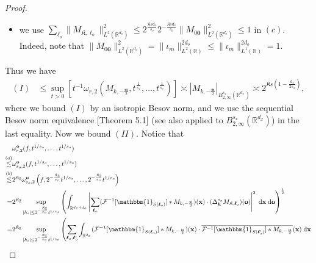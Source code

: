 \documentclass[11pt]{article}
\newcommand{\one}{\mathbbm{1}}
\newcommand{\bx}{\mathbf x}
\newcommand{\bo}{\mathbf o}
\newcommand{\calF}{\mathcal{F}}
\newcommand{\bl}{{\boldsymbol\ell}}
\newcommand{\0}{\mathbf{0}}
\newcommand{\bh}{\boldsymbol{h}}
\begin{document}
\begin{appendix}
\begin{proof}
\begin{itemize}
\begin{align}
\begin{aligned}
    &\leq \|\calF[\Delta_{\bh}^rM_{k,-\frac{\mathfrak{m}}{2}}]\|^2_{L^2(\mathbb{R}^{d_x})} = \|\Delta_{\bh}^rM_{k,-\frac{\mathfrak{m}}{2}}\|^2_{L^2(\mathbb{R}^{d_x})},
\end{aligned}
\end{align}
\item we use $
\sum_{\bl_o}\|M_{\mathfrak{K},\bl_o}\|^2_{L^2(\mathbb{R}^{d_o})} \leq 2^{\frac{\mathfrak{K}\underline{s}d_o}{s_o}}2^{-\frac{\mathfrak{K}\underline{s}d_o}{s_o}}\|M_{0\boldsymbol{0}}\|^2_{L^2(\mathbb{R}^{d_o})} \leq 1$ in $(c)$. Indeed, note that $\|M_{0\boldsymbol{0}}\|^2_{L^2(\mathbb{R}^{d_o})} = \|\iota_{m}\|^{2d_o}_{L^2(\mathbb{R})} \leq \|\iota_{m}\|^{2d_o}_{L^1(\mathbb{R})} = 1$. 
\end{itemize}
Thus we have
\begin{align*}
    (I)&\leq \sup_{t>0}\left[t^{-1}\omega_{r,2}\left(M_{k,-\frac{\mathfrak{m}}{2}},t^{\frac{1}{s_x}},\dots,t^{\frac{1}{s_x}}\right)\right] \asymp |M_{k,-\frac{\mathfrak{m}}{2}}|_{B^{s_x}_{2,\infty}(\mathbb{R}^{d_x})} \asymp 2^{\mathfrak{K}\underline{s}\left(1 -\frac{d_x}{2s_x}\right)},
\end{align*}
where we bound $(I)$ by an isotropic Besov norm, and we use the sequential Besov norm equivalence \citep{devore1988interpolation}[Theorem 5.1] (see also \citet[Theorem 3.4]{leisner_nonlinear_wavelet_approximation_2003} applied to $B^{s_x}_{2,\infty}(\mathbb{R}^{d_x})$) in the last equality. Now we bound $(II)$. Notice that
\begin{align*}
    &\omega^{\bo}_{r,2}(f,t^{1/s_o},\dots, t^{1/s_o})\\
    \stackrel{(a)}{\lesssim} &\omega_{s_o,2}^{\bo}(f,t^{1/s_o},\dots, t^{1/s_o})\\
    \stackrel{(b)}{\lesssim} &2^{\mathfrak{K}\underline{s}}\omega^{\bo}_{s_o,2}\left(f,2^{-\frac{\mathfrak{K}\underline{s}}{s_o}}t^{1/s_o},\dots, 2^{-\frac{\mathfrak{K}\underline{s}}{s_o}}t^{1/s_o}\right)\\
    =&2^{\mathfrak{K}\underline{s}} \sup_{|h_i|\leq 2^{-\frac{\mathfrak{K}\underline{s}}{s_o}}t^{1/s_o}}\left(\int_{\mathbb{R}^{d_x+d_o}} \left|\sum_{\bl_o}(\calF^{-1}[\one_{S(\bl_o)}] \ast M_{k,-\frac{\mathfrak{m}}{2}})(\bx) \cdot (\Delta^{s_o}_{\bh} M_{\mathfrak{K},\bl_o})(\bo) \right|^2 \;\mathrm{d}\bx\;\mathrm{d}\bo\right)^{\frac{1}{2}}\\
    =&2^{\mathfrak{K}\underline{s}}\sup_{|h_i|\leq 2^{-\frac{\mathfrak{K}\underline{s}}{s_o}} t^{1/s_o}}\left(\sum_{\bl_o,\bl_o'}\int_{\mathbb{R}^{d_x}} (\calF^{-1}[\one_{S(\bl_o)}]\ast M_{k,-\frac{\mathfrak{m}}{2}})(\bx) \cdot \overline{\calF^{-1}[\one_{S(\bl_o^\prime)}]\ast M_{k,-\frac{\mathfrak{m}}{2}}}(\bx)\;\mathrm{d}\bx \right. \\

\end{align*}
\end{proof}
\end{appendix}
\end{document}
